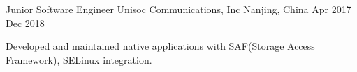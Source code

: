 \begin{cventries}
  \cventry
    {Junior Software Engineer} %
    {Unisoc Communications, Inc} %
    {Nanjing, China} %
    {Apr 2017 \textemdash Dec 2018} %
    {
      \begin{cvitems} %
        \item {Developed and maintained native applications with SAF(Storage Access Framework), SELinux integration. }
      \end{cvitems}
    }

\end{cventries}
